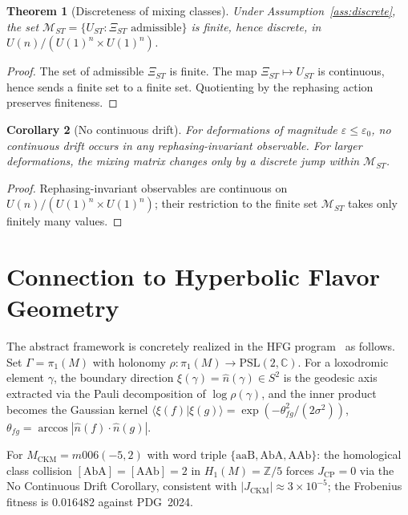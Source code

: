 \documentclass[11pt,a4paper]{article}
\newtheorem{theorem}{Theorem}
\newtheorem{corollary}[theorem]{Corollary}
\begin{document}
\begin{theorem}[Discreteness of mixing classes]
\label{thm:discreteness}
Under Assumption~\ref{ass:discrete}, the set
$\mathcal{M}_{ST}=\{U_{ST}:\Xi_{ST}\text{ admissible}\}$
is finite, hence discrete, in
$U(n)/(U(1)^n\times U(1)^n)$.
\end{theorem}

\begin{proof}
The set of admissible $\Xi_{ST}$ is finite.
The map $\Xi_{ST}\mapsto U_{ST}$ is continuous, hence sends a finite
set to a finite set.
Quotienting by the rephasing action preserves finiteness.
\end{proof}

\begin{corollary}[No continuous drift]
For deformations of magnitude $\varepsilon\leq\varepsilon_0$, no
continuous drift occurs in any rephasing-invariant observable.
For larger deformations, the mixing matrix changes only by a discrete
jump within $\mathcal{M}_{ST}$.
\end{corollary}

\begin{proof}
Rephasing-invariant observables are continuous on
$U(n)/(U(1)^n\times U(1)^n)$;
their restriction to the finite set $\mathcal{M}_{ST}$ takes only
finitely many values.
\end{proof}

\section{Connection to Hyperbolic Flavor Geometry}
\label{sec:hfg}

The abstract framework is concretely realized in the HFG
program~\cite{Gentry:CKM,Gentry:PMNS,Gentry:Unified} as follows.
Set $\Gamma=\pi_1(M)$ with holonomy
$\rho:\pi_1(M)\to\mathrm{PSL}(2,\mathbb{C})$.
For a loxodromic element $\gamma$, the boundary direction
$\xi(\gamma)=\hat{n}(\gamma)\in S^2$ is the geodesic axis extracted
via the Pauli decomposition of $\log\rho(\gamma)$,
and the inner product becomes the Gaussian kernel
$\langle\xi(f)|\xi(g)\rangle=\exp(-\theta_{fg}^2/(2\sigma^2))$,
$\theta_{fg}=\arccos|\hat{n}(f)\cdot\hat{n}(g)|$.

For $M_{\mathrm{CKM}}=m006(-5,2)$ with word triple
$\{\mathrm{aaB},\mathrm{AbA},\mathrm{AAb}\}$:
the homological class collision
$[\mathrm{AbA}]=[\mathrm{AAb}]=2$ in $H_1(M)=\mathbb{Z}/5$
forces $J_{\mathrm{CP}}=0$ via the No Continuous Drift Corollary,
consistent with $|J_{\mathrm{CKM}}|\approx3\times10^{-5}$;
the Frobenius fitness is $0.016482$ against PDG~2024.
\end{document}
